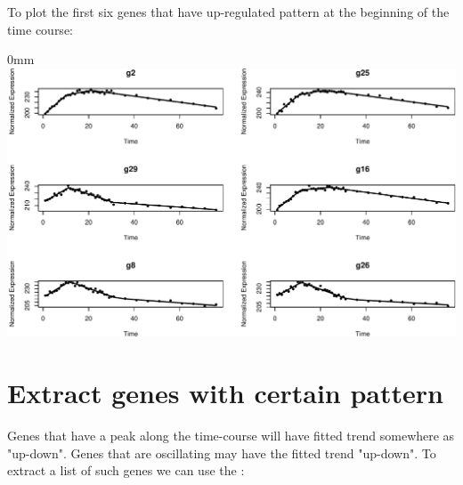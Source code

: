 \documentclass{article}
\begin{document}
To plot the first six genes that have up-regulated pattern at the beginning of
the time course:
\begin{knitrout}
\color{fgcolor}\begin{kframe}
\begin{alltt}
\hlstd{(}\hlstd{=}\hlstd{(}\hlstd{,}\hlstd{))}
 \hlkwb{<-}  
                         \hlstd{=} \hlopt{$}\hlstd{firstup)[}\hlopt{:}\hlstd{],}
                         
\end{alltt}
\end{kframe}\begin{adjustwidth}{\fltoffset}{0mm}
\includegraphics[width=\maxwidth]{figure/unnamed-chunk-18-1} \end{adjustwidth}
\end{knitrout}



\section{Extract genes with certain pattern}
Genes that have a peak along the time-course will have fitted trend somewhere 
as "up-down". Genes that are oscillating may have the fitted trend "up-down". 
To extract a list of such genes we can use the :
\end{document}
